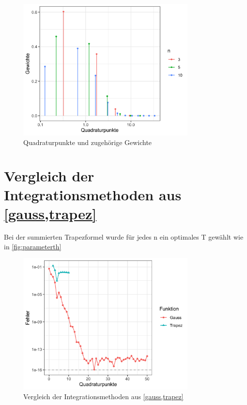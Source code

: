 \documentclass[12pt,a4paper]{scrartcl}
\numberwithin{equation}{section}
\numberwithin{myalgctr}{section}
\numberwithin{mytheoremctr}{section}
\numberwithin{mykorollarctr}{section}
\numberwithin{mylemmactr}{section}
\numberwithin{mybeispielctr}{section}
\begin{document}
	\begin{figure}[H]
		\begin{center}
			\includegraphics[width=0.8\textwidth]{../plots/quadraturpunkte-n-zusammen.png}
		\end{center}
		\caption{Quadraturpunkte und zugeh\"orige Gewichte}
		\label{fig:quadraturpunkte}
	\end{figure}
	
	\newpage
	\section{Vergleich der Integrationsmethoden aus \cref{gauss,trapez}}
	Bei der summierten Trapezformel wurde für jedes n ein optimales T gewählt wie in \cref{fig:parameterth}
	\begin{figure}[H]
		\begin{center}
			\includegraphics[width=0.8\textwidth]{../plots/aufgabe-e2.png}
		\end{center}
		\caption{Vergleich der Integrationsmethoden aus \cref{gauss,trapez}}
		\label{fig:vergleich}	
	\end{figure}
\end{document}
